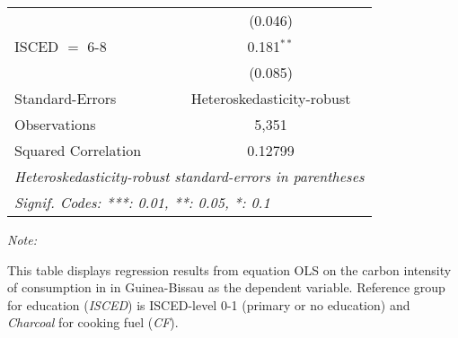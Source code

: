 \begin{table}[htbp!]
\begin{adjustbox}{width = 1\textwidth, max height = 0.95\textheight, center}
\begin{threeparttable}[b]
\begin{tabular}{lc}
                                & (0.046)\\   
            ISCED $=$ 6-8       & 0.181$^{**}$\\   
                                & (0.085)\\   
            \midrule 
            Standard-Errors     & Heteroskedasticity-robust \\   
            Observations        & 5,351\\  
            Squared Correlation & 0.12799\\  
            \midrule \midrule
            \multicolumn{2}{l}{\emph{Heteroskedasticity-robust standard-errors in parentheses}}\\
            \multicolumn{2}{l}{\emph{Signif. Codes: ***: 0.01, **: 0.05, *: 0.1}}\\
         \end{tabular}
         
         \begin{tablenotes}\item \medskip \textit{Note:}
            \item This table displays regression results from equation OLS on the carbon intensity of consumption in  in Guinea-Bissau as the dependent variable. Reference group for education (\textit{ISCED}) is ISCED-level 0-1 (primary or no education) and \textit{Charcoal} for cooking fuel (\textit{CF}).
         \end{tablenotes}
      \end{threeparttable}
   \end{adjustbox}
\end{table}


